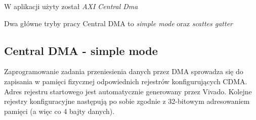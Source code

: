 W aplikacji użyty został \textit{AXI Central Dma}

Dwa główne tryby pracy Central DMA to \textit{simple mode} oraz \textit{scattes gatter}

\subsection{Central DMA - simple mode}
\label{sec:logika:dma:simple}

Zaprogramowanie zadania przeniesienia danych przez DMA sprowadza się do zapisania w pamięci fizycznej
odpowiednich rejestrów konfigurujących CDMA. Adres rejestru startowego jest automatycznie
generowany przez Vivado. Kolejne rejestry konfiguracyjne następują po sobie zgodnie
z 32-bitowym adresowaniem pamięci (a więc co 4 bajty danych).


